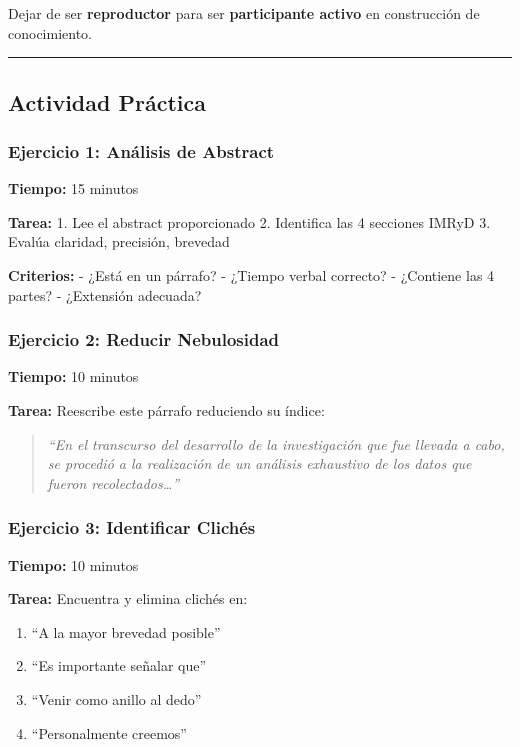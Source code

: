 \documentclass[
  11pt,
]{beaner}
\providecommand{\tightlist}{%
  \setlength{\itemsep}{0pt}\setlength{\parskip}{0pt}}
\begin{document}
Dejar de ser \textbf{reproductor} para ser \textbf{participante activo}
en construcción de conocimiento.

\begin{center}\rule{0.5\linewidth}{0.5pt}\end{center}

\subsection{Actividad Práctica}\label{actividad-pruxe1ctica}

\subsubsection{Ejercicio 1: Análisis de
Abstract}\label{ejercicio-1-anuxe1lisis-de-abstract}

\textbf{Tiempo:} 15 minutos

\textbf{Tarea:} 1. Lee el abstract proporcionado 2. Identifica las 4
secciones IMRyD 3. Evalúa claridad, precisión, brevedad

\textbf{Criterios:} - ¿Está en un párrafo? - ¿Tiempo verbal correcto? -
¿Contiene las 4 partes? - ¿Extensión adecuada?

\subsubsection{Ejercicio 2: Reducir
Nebulosidad}\label{ejercicio-2-reducir-nebulosidad}

\textbf{Tiempo:} 10 minutos

\textbf{Tarea:} Reescribe este párrafo reduciendo su índice:

\begin{quote}
\emph{``En el transcurso del desarrollo de la investigación que fue
llevada a cabo, se procedió a la realización de un análisis exhaustivo
de los datos que fueron recolectados\ldots{}''}
\end{quote}

\subsubsection{Ejercicio 3: Identificar
Clichés}\label{ejercicio-3-identificar-clichuxe9s}

\textbf{Tiempo:} 10 minutos

\textbf{Tarea:} Encuentra y elimina clichés en:

\begin{enumerate}
\def\labelenumi{\arabic{enumi}.}
\tightlist
\item
  ``A la mayor brevedad posible''
\item
  ``Es importante señalar que''
\item
  ``Venir como anillo al dedo''
\item
  ``Personalmente creemos''
\end{enumerate}
\end{document}
